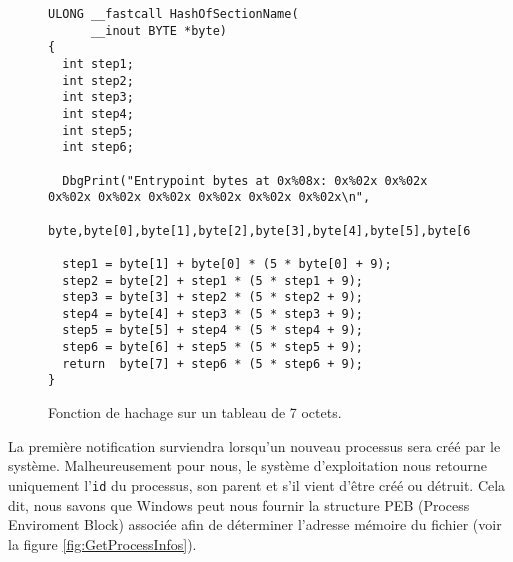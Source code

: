 \documentclass[times,11pt,fullpage]{article}
\begin{document}
\begin{figure}
\scriptsize
\begin{framed}
\begin{verbatim}
ULONG __fastcall HashOfSectionName(
      __inout BYTE *byte)
{
  int step1; 
  int step2; 
  int step3; 
  int step4; 
  int step5; 
  int step6; 

  DbgPrint("Entrypoint bytes at 0x%08x: 0x%02x 0x%02x 0x%02x 0x%02x 0x%02x 0x%02x 0x%02x 0x%02x\n",
            byte,byte[0],byte[1],byte[2],byte[3],byte[4],byte[5],byte[6],byte[7]);
 
  step1 = byte[1] + byte[0] * (5 * byte[0] + 9);
  step2 = byte[2] + step1 * (5 * step1 + 9);
  step3 = byte[3] + step2 * (5 * step2 + 9);
  step4 = byte[4] + step3 * (5 * step3 + 9);
  step5 = byte[5] + step4 * (5 * step4 + 9);
  step6 = byte[6] + step5 * (5 * step5 + 9);
  return  byte[7] + step6 * (5 * step6 + 9);
}
\end{verbatim}
\end{framed}
\caption{Fonction de hachage sur un tableau de 7 octets.\label{fig:HashOfSectionName}}
\end{figure}
La première notification surviendra lorsqu'un nouveau processus sera créé par le système. Malheureusement pour nous, le système d'exploitation nous retourne uniquement l'\texttt{id} du processus, son parent et s'il vient d'être créé ou détruit. Cela dit, nous savons que Windows peut nous fournir la structure PEB (Process Enviroment Block) associée afin de déterminer l'adresse mémoire du fichier (voir la figure \ref{fig:GetProcessInfos}).
\end{document}

